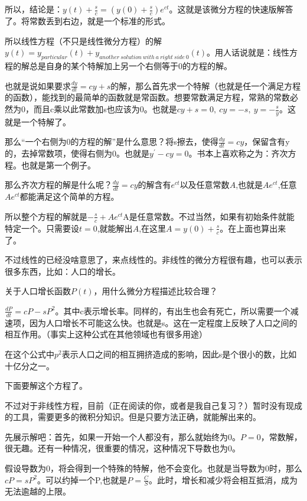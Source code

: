 \documentclass[UTF8]{ctexbook}
\newcommand{\derivative}{^\prime}
\begin{document}
{{{{  所以，结论是：$y(t) + \frac{s}{c} = (y(0) + \frac{s}{c})e^{ct}$。这就是该微分方程的快速版解答了。将常数丢到右边，就是一个标准的形式。

  所以线性方程（不只是线性微分方程）的解$y(t) = y_{particular}(t) + y_{another\ solution\ with\ a\ right\ side\ 0}(t)$。用人话说就是：线性方程的解总是自身的某个特解加上另一个右侧等于0的方程的解。

  也就是说如果要求$\frac{dy}{dt} = cy + s$的解，那么首先求一个特解（也就是任一个满足方程的函数），能找到的最简单的函数就是常函数。想要常数满足方程，常熟的常数必然为0，而且c乘以此常数加s也应该为0。也就是$cy + s = 0,\ cy = -s, \ y = -\frac{s}{y}$。这就是一个特解了。

  那么“一个右侧为0的方程的解”是什么意思？将s擦去，使得$\frac{dy}{dt} = cy$，保留含有y的，去掉常数项，使得右侧为0。也就是$y\derivative - cy = 0$。书本上喜欢称之为：齐次方程。也就是第一个例子。

  那么齐次方程的解是什么呢？$\frac{dy}{dt} = cy$的解含有$e^{ct}$以及任意常数$A$,也就是$Ae^{ct}$,任意$Ae^{ct}$都能满足这个简单的方程。

  所以整个方程的解就是$-\frac{s}{c} + Ae^{ct}$A是任意常数。不过当然，如果有初始条件就能特定一个。只需要设$t = 0$,就能解出$A$,在这里$A = y(0) + \frac{s}{c}$。在上面也算出来了。

  不过线性的已经没啥意思了，来点线性的。非线性的微分方程很有趣，也可以表示很多东西，比如：人口的增长。

  关于人口增长函数$P(t)$，用什么微分方程描述比较合理？

  $\frac{dP}{dt} = cP - sP^2$。其中c表示增长率。同样的，有出生也会有死亡，所以需要一个减速项，因为人口增长不可能这么快。也就是s。这在一定程度上反映了人口之间的相互作用。（事实上这种公式在其他领域也有很多用途）

  在这个公式中$p^2$表示人口之间的相互拥挤造成的影响，因此s是个很小的数，比如十亿分之一。

  下面要解这个方程了。

  不过对于非线性方程，目前（正在阅读的你，或者是我自己复习？）暂时没有现成的工具，需要更多的微积分知识。但是只要方法正确，就能解出来的。

  先展示解吧：首先，如果一开始一个人都没有，那么就始终为0。$P = 0$，常数解，很无趣。还有一种情况，很重要的情况，这种情况下导数也为0。

  假设导数为0，将会得到一个特殊的特解，他不会变化。也就是当导数为0时，那么$cP = sP^2$。可以约掉一个P,也就是$P = \frac{C}{S}$。此时，增长和减少将会相互抵消，成为无法逾越的上限。

}}}}
\end{document}
